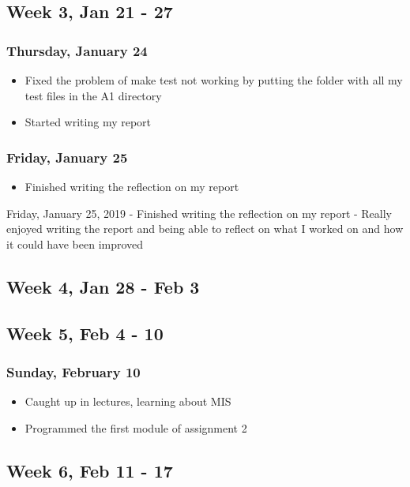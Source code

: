 \documentclass{article}
\begin{document}
\subsection{Week 3, Jan 21 - 27}

\subsubsection{Thursday, January 24}
\begin{itemize}
    \item Fixed the problem of make test not working by putting the folder with all my test files in the A1 directory
    \item Started writing my report
\end{itemize}

\subsubsection{Friday, January 25}
\begin{itemize}
    \item Finished writing the reflection on my report
\end{itemize}

Friday, January 25, 2019
	- Finished writing the reflection on my report
	- Really enjoyed writing the report and being able to reflect on what I worked on and how it could have been improved

\subsection{Week 4, Jan 28 - Feb 3}

\subsection{Week 5, Feb 4 - 10}

\subsubsection{Sunday, February 10}
\begin{itemize}
    \item Caught up in lectures, learning about MIS
    \item Programmed the first module of assignment 2
\end{itemize}

\subsection{Week 6, Feb 11 - 17}
\end{document}
